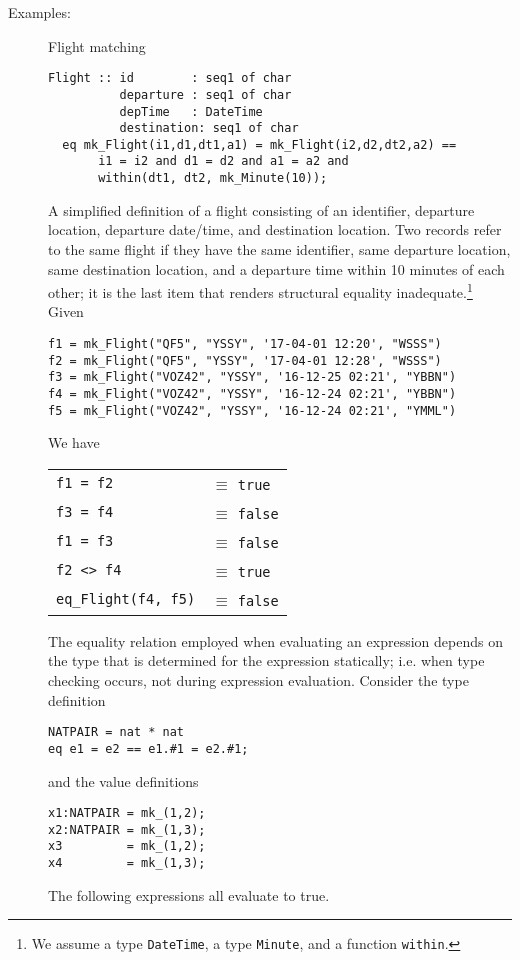 \documentclass{overturerepchap}
\begin{document}
\begin{description}
\item[Examples:]Flight matching
\begin{lstlisting}
Flight :: id        : seq1 of char
          departure : seq1 of char
          depTime   : DateTime
          destination: seq1 of char
  eq mk_Flight(i1,d1,dt1,a1) = mk_Flight(i2,d2,dt2,a2) ==
       i1 = i2 and d1 = d2 and a1 = a2 and 
       within(dt1, dt2, mk_Minute(10));
\end{lstlisting}

A simplified definition of a flight consisting of an identifier, departure location, departure date/time, and destination location. Two records refer to the same flight if they have the same identifier, same departure location, same destination location, and a departure time within 10 minutes of each other; it is the last item that renders structural equality inadequate.\footnote{We assume a type {\tt DateTime}, a type {\tt Minute}, and a function {\tt within}.}
Given
\begin{lstlisting}
f1 = mk_Flight("QF5", "YSSY", '17-04-01 12:20', "WSSS")
f2 = mk_Flight("QF5", "YSSY", '17-04-01 12:28', "WSSS")
f3 = mk_Flight("VOZ42", "YSSY", '16-12-25 02:21', "YBBN")
f4 = mk_Flight("VOZ42", "YSSY", '16-12-24 02:21', "YBBN")
f5 = mk_Flight("VOZ42", "YSSY", '16-12-24 02:21', "YMML")
\end{lstlisting}
We have

\begin{tabular}{l l}
{\tt f1 = f2} & $\equiv$ {\tt true} \\
{\tt f3 = f4} & $\equiv$ {\tt false} \\
{\tt f1 = f3} & $\equiv$ {\tt false} \\
{\tt f2 <> f4} & $\equiv$ {\tt true} \\
{\tt eq\_Flight(f4, f5)} & $\equiv$ {\tt false}\\ 
\end{tabular}

The equality relation employed when evaluating an expression depends on the type that is determined for the expression statically; i.e. when type checking occurs, not during expression evaluation. 
Consider the type definition
\begin{lstlisting}
NATPAIR = nat * nat
eq e1 = e2 == e1.#1 = e2.#1;
\end{lstlisting}
and the value definitions
\begin{lstlisting}
x1:NATPAIR = mk_(1,2);
x2:NATPAIR = mk_(1,3);
x3         = mk_(1,2);
x4         = mk_(1,3);
\end{lstlisting}
The following expressions all evaluate to true.


\end{description}
\end{document}
